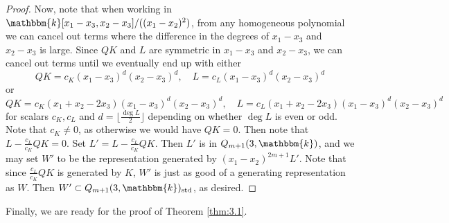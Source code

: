 \documentclass[11pt]{article}
\theoremstyle{definition}
\renewcommand{\k}{\mathbbm{k}}
\newcommand{\std}{\mathrm{std}}
\begin{document}
\begin{proof}
    Now, note that when working in $\k[x_1-x_3,x_2-x_3]/((x_1-x_2)^2)$, from any homogeneous polynomial we can cancel out terms where the difference in the degrees of $x_1-x_3$ and $x_2-x_3$ is large. Since $QK$ and $L$ are symmetric in $x_1-x_3$ and $x_2-x_3$, we can cancel out terms until we eventually end up with either
    $$QK=c_K(x_1-x_3)^d(x_2-x_3)^d,\quad L=c_L(x_1-x_3)^d(x_2-x_3)^d$$
    or 
    $$QK=c_K(x_1+x_2-2x_3)(x_1-x_3)^d(x_2-x_3)^d,\quad L=c_L(x_1+x_2-2x_3)(x_1-x_3)^d(x_2-x_3)^d$$
    for scalars $c_K,c_L$ and $d=\Big\lfloor\frac{\deg L}{2}\Big\rfloor$ depending on whether $\deg L$ is even or odd. Note that $c_K\neq 0$, as otherwise we would have $QK=0$. Then note that $L-\frac{c_L}{c_K}QK=0$. Set $L'=L-\frac{c_L}{c_K}QK$. Then $L'$ is in $Q_{m+1}(3,\k)$, and we may set $W'$ to be the representation generated by $(x_1-x_2)^{2m+1}L'$. Note that since $\frac{c_L}{c_K}QK$ is generated by $K$, $W'$ is just as good of a generating representation as $W$. Then $W'\subset Q_{m+1}(3,\k)_\std$, as desired.
\end{proof}

Finally, we are ready for the proof of Theorem \ref{thm:3.1}.
\end{document}

